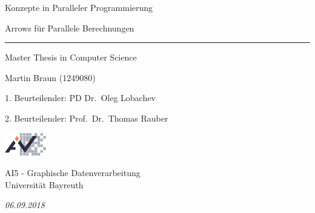 \documentclass[paper=A4,twoside=true,openright,parskip=full,chapterprefix=true,headings=normal,bibliography=totoc,listof=totoc,titlepage=on,captions=tableabove,draft=false,british]{scrreprt}%
\newcommand{\thesisTitleGerman}{Konzepte in Paralleler Programmierung}
\newcommand{\thesisName}{Martin Braun (1249080)}
\newcommand{\thesisDate}{06.09.2018}
\newcommand{\thesisUniversityDepartmentGerman}{AI5 - Graphische Datenverarbeitung}
\begin{document}
\pagestyle{plain}
\begin{abstract}
Arrows are a general functional interface for computation and an
alternative to Monads for API design. In contrast to Monad-based
parallelism, we explore the use of Arrows for specifying generalised
parallelism. Specifically, we define an Arrow-based language and
implement it using multiple parallel Haskells. As each parallel
computation is an Arrow, such parallel Arrows (PArrows) can be readily
composed and transformed. To allow for more sophisticated communication
schemes between computation nodes in distributed systems, we utilise the
concept of Futures to wrap direct communication. Addressing the recent
trends in cloud computing, we also explore the possibility for a cloud
based implementation of this newly created DSL. To show that PArrows
have similar expressive power as existing parallel languages, we
implement several algorithmic skeletons and four benchmarks. These
show that our framework does not induce any notable
performance overhead. We conclude that Arrows have considerable
potential for composing parallel programs and more specifically for
programs that have to be executed with multiple different parallel
language implementations.
\end{abstract}
\cleardoublepage

\begin{titlepage}
\flushright
\hfill
\vfill
{\huge\thesisTitleGerman \par}
{\LARGE Arrows für Parallele Berechnungen \par}
\rule[5pt]{\textwidth}{.4pt} \par
{\Large Master Thesis in Computer Science \par}
{\Large\thesisName} \par
{1. Beurteilender: \Large PD Dr.~Oleg Lobachev} \par
{2. Beurteilender: \Large Prof.~Dr.~Thomas Rauber} \par

\vfill
\vspace*{7cm}
%
\begin{minipage}{2cm}
\includegraphics[height=1cm]{src/img/ai5logo.pdf}
\end{minipage}
%
\begin{minipage}{7cm}
\vspace{16pt}
\thesisUniversityDepartmentGerman \\
Universität Bayreuth \\
\end{minipage}
\hfill
\begin{minipage}{3cm}
\vspace*{18pt}
\begin{flushright}
\textit{\large\thesisDate}
\end{flushright}
\end{minipage}
%
\end{titlepage}
\cleardoublepage
\end{document}
